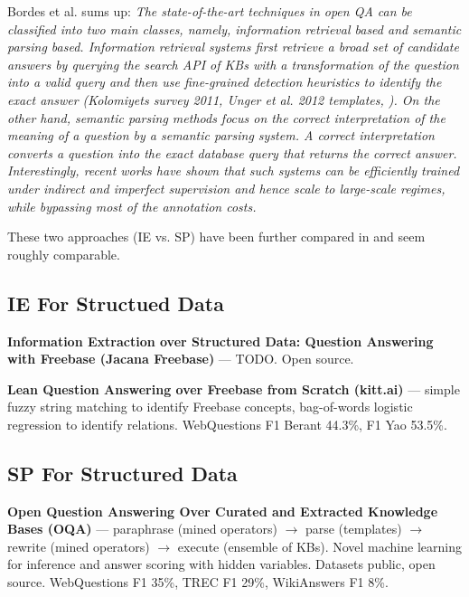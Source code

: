Bordes et al. \cite{Semantic2014Bordes} sums up:
\textit{%
The state-of-the-art techniques in open QA can be classified into two main
classes, namely, information retrieval based and semantic parsing based. Information
retrieval systems first retrieve a broad set of candidate answers by querying
the search API of KBs with a transformation of the question into a valid
query and then use fine-grained detection heuristics to identify the exact answer
(Kolomiyets survey 2011, Unger et al. 2012 templates, \cite{TreeFreebase2014Yao}).
On the other hand, semantic parsing methods focus on the correct
interpretation of the meaning of a question by a semantic parsing system. A
correct interpretation converts a question into the exact database query that
returns the correct answer. Interestingly, recent works \cite{Semantic2013Berant} \cite{SPBerant2014Paraphrase} \cite{OQA} have shown that
such systems can be efficiently trained under indirect and imperfect supervision
and hence scale to large-scale regimes, while bypassing most of the annotation
costs.}

These two approaches (IE vs. SP) have been further compared in \cite{FreebaseQA2014Yao}
and seem roughly comparable.

\subsection{IE For Structued Data}

\textbf{Information Extraction over Structured Data: Question Answering with Freebase (Jacana Freebase)} \cite{TreeFreebase2014Yao}
	--- TODO.
		Open source.

\textbf{Lean Question Answering over Freebase from Scratch (kitt.ai)} \cite{LeanFreebaseYao}
	--- simple fuzzy string matching to identify Freebase concepts,
		bag-of-words logistic regression to identify relations.
		WebQuestions F1 Berant 44.3\%, F1 Yao 53.5\%.

\subsection{SP For Structured Data}

\textbf{Open Question Answering Over Curated and Extracted Knowledge Bases (OQA)} \cite{OQA}
	--- paraphrase (mined operators) $\to$ parse (templates) $\to$ rewrite (mined operators) $\to$ execute (ensemble of KBs).
	Novel machine learning for inference and answer scoring with hidden variables.
	Datasets public, open source.
	WebQuestions F1 35\%, TREC F1 29\%, WikiAnswers F1 8\%.

